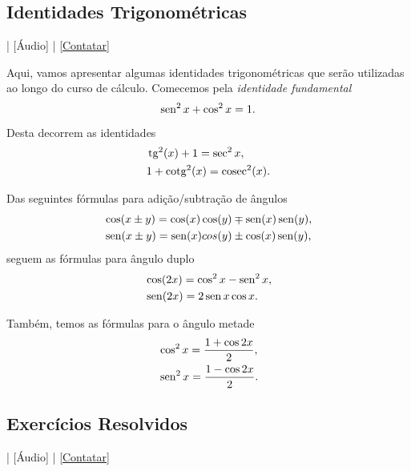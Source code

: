 \subsection{Identidades Trigonométricas}

\begin{flushright}
  [Vídeo] | [Áudio] | \href{https://phkonzen.github.io/notas/contato.html}{[Contatar]}
\end{flushright}

Aqui, vamos apresentar algumas identidades trigonométricas que serão utilizadas ao longo do curso de cálculo. Comecemos pela \emph{identidade fundamental}
\begin{equation}
  \operatorname{sen}^2 x + \cos^2 x = 1.
\end{equation}
Desta decorrem as identidades
\begin{align}
  &\operatorname{tg}^2(x) + 1 = \sec^2 x,\\
  &1 + \operatorname{cotg}^2(x) = \operatorname{cosec}^2(x).
\end{align}

Das seguintes fórmulas para adição/subtração de ângulos
\begin{align}
  &\cos(x\pm y) = \cos(x)\cos(y) \mp \operatorname{sen}(x)\operatorname{sen}(y),\\
  &\operatorname{sen}(x\pm y) = \operatorname{sen}(x)cos(y) \pm \cos(x)\operatorname{sen}(y),
\end{align}
seguem as fórmulas para ângulo duplo
\begin{align}
  &\cos(2x) = \cos^2x - \operatorname{sen}^2x,\\
  &\operatorname{sen}(2x) = 2\operatorname{sen} x\cos x.
\end{align}

Também, temos as fórmulas para o ângulo metade
\begin{align}
  &\cos^2 x = \frac{1 + \cos 2x}{2},\\
  &\operatorname{sen}^2 x = \frac{1 - \cos 2x}{2}.\label{eq:id_trig_cos_x2}
\end{align}

\subsection*{Exercícios Resolvidos}

\begin{flushright}
  [Vídeo] | [Áudio] | \href{https://phkonzen.github.io/notas/contato.html}{[Contatar]}
\end{flushright}

